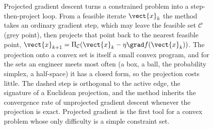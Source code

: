 \begin{figure}[ht]
\begin{tikzpicture}[x=1.15cm, y=1.15cm, font=\small]
\end{tikzpicture}
\caption[The projected-gradient step]{Projected gradient descent turns
a constrained problem into a step-then-project loop. From a feasible
iterate $\vect{x}_{k}$ the method takes an ordinary gradient step,
which may leave the feasible set $\mathcal{C}$ (grey point), then
projects that point back to the nearest feasible point, $\vect{x}_{k+1}
= \Pi_{\mathcal{C}}(\vect{x}_{k} - \eta \grad f(\vect{x}_{k}))$. The
projection onto a convex set is itself a small convex program, and for
the sets an engineer meets most often (a box, a ball, the probability
simplex, a half-space) it has a closed form, so the projection costs
little. The dashed step is orthogonal to the active edge, the
signature of a Euclidean projection, and the method inherits the
convergence rate of unprojected gradient descent whenever the
projection is exact. Projected gradient is the first tool for a convex
problem whose only difficulty is a simple constraint set.}
\label{fig:vol02:ch15:projected-gradient}
\end{figure}
